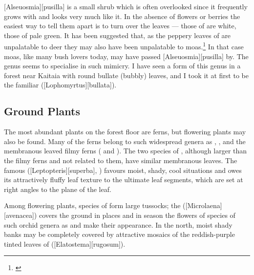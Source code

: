[Alseuosmia][pusilla] is a small shrub which is often overlooked since it frequently grows with  and looks very much like it.
In the absence of flowers or berries the easiest way to tell them apart is to turn over the leaves --- those of  are white, those of  pale green.
It has been suggested that, as the peppery leaves of  are unpalatable to deer they may also have been unpalatable to moas.\footnote{\cite{greenwood1977evolution}}
In that case moas, like many bush lovers today, may have passed [Alseuosmia][pusilla] by.
The genus  seems to specialise in such mimicry.
I have seen a form of this genus in a forest near Kaitaia with round bullate (bubbly) leaves, and I took it at first to be the familiar  ([Lophomyrtus][bullata]).

\subsection{Ground Plants}

The most abundant plants on the forest floor are ferns, but flowering plants may also be found.
Many of the ferns belong to such widespread genera as , ,  and the membranous leaved filmy ferns ( and ).
The two species of , although larger than the filmy ferns and not related to them, have similar membranous leaves.
The famous  ([Leptopteris][superba], ) favours moist, shady, cool situations and owes its attractively fluffy leaf texture to the ultimate leaf segments, which are set at right angles to the plane of the leaf.

Among flowering plants, species of  form large tussocks; the  ([Microlaena][avenacea]) covers the ground in places and in season the flowers of species of such orchid genera as  and  make their appearance.
In the north, moist shady banks may be completely covered by attractive mosaics of the reddish-purple tinted leaves of  ([Elatostema][rugosum]).

